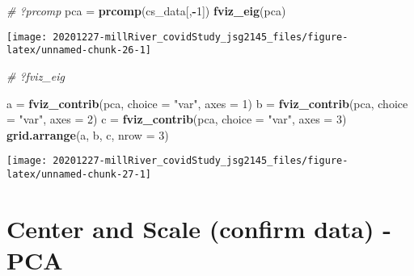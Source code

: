 \documentclass[
]{article}
\newenvironment{Shaded}{\begin{snugshade}}{\end{snugshade}}
\newcommand{\CommentTok}[1]{\textcolor[rgb]{0.56,0.35,0.01}{\textit{#1}}}
\newcommand{\DataTypeTok}[1]{\textcolor[rgb]{0.13,0.29,0.53}{#1}}
\newcommand{\DecValTok}[1]{\textcolor[rgb]{0.00,0.00,0.81}{#1}}
\newcommand{\KeywordTok}[1]{\textcolor[rgb]{0.13,0.29,0.53}{\textbf{#1}}}
\newcommand{\NormalTok}[1]{#1}
\newcommand{\OperatorTok}[1]{\textcolor[rgb]{0.81,0.36,0.00}{\textbf{#1}}}
\newcommand{\StringTok}[1]{\textcolor[rgb]{0.31,0.60,0.02}{#1}}
\begin{document}
\begin{Shaded}
\begin{Highlighting}[]
\CommentTok{# ?prcomp}
\NormalTok{pca =}\StringTok{ }\KeywordTok{prcomp}\NormalTok{(cs_data[,}\OperatorTok{-}\DecValTok{1}\NormalTok{])}
\KeywordTok{fviz_eig}\NormalTok{(pca)}
\end{Highlighting}
\end{Shaded}

\texttt{[image: 20201227-millRiver\_covidStudy\_jsg2145\_files/figure-latex/unnamed-chunk-26-1]}

\begin{Shaded}
\begin{Highlighting}[]
\CommentTok{# ?fviz_eig}
\end{Highlighting}
\end{Shaded}

\begin{Shaded}
\begin{Highlighting}[]
\NormalTok{a =}\StringTok{ }\KeywordTok{fviz_contrib}\NormalTok{(pca, }\DataTypeTok{choice =} \StringTok{"var"}\NormalTok{, }\DataTypeTok{axes =} \DecValTok{1}\NormalTok{) }
\NormalTok{b =}\StringTok{ }\KeywordTok{fviz_contrib}\NormalTok{(pca, }\DataTypeTok{choice =} \StringTok{"var"}\NormalTok{, }\DataTypeTok{axes =} \DecValTok{2}\NormalTok{) }
\NormalTok{c =}\StringTok{ }\KeywordTok{fviz_contrib}\NormalTok{(pca, }\DataTypeTok{choice =} \StringTok{"var"}\NormalTok{, }\DataTypeTok{axes =} \DecValTok{3}\NormalTok{) }
\KeywordTok{grid.arrange}\NormalTok{(a, b, c, }\DataTypeTok{nrow =} \DecValTok{3}\NormalTok{)}
\end{Highlighting}
\end{Shaded}

\texttt{[image: 20201227-millRiver\_covidStudy\_jsg2145\_files/figure-latex/unnamed-chunk-27-1]}

\hypertarget{center-and-scale-confirm-data---pca}{%
\section{Center and Scale (confirm data) -
PCA}\label{center-and-scale-confirm-data---pca}}

\begin{Shaded}
\end{Shaded}
\end{document}
